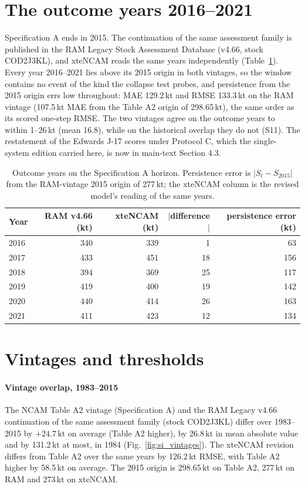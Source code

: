 \documentclass[preprint,11pt,authoryear]{elsarticle}
\theoremstyle{remark}
\newcommand{\kt}{\,\mathrm{kt}}
\begin{document}
\FloatBarrier
\section{The outcome years 2016--2021}\label{si:outcome}

Specification A ends in 2015. The continuation of the same assessment family is published in the RAM Legacy Stock Assessment Database (v4.66, stock COD2J3KL), and xteNCAM reads the same years independently (Table~\ref{tab:si_outcome}). Every year 2016--2021 lies above its 2015 origin in both vintages, so the window contains no event of the kind the collapse test probes, and persistence from the 2015 origin errs low throughout: MAE 129.2\,kt and RMSE 133.3\,kt on the RAM vintage (107.5\,kt MAE from the Table A2 origin of 298.65\,kt), the same order as its scored one-step RMSE. The two vintages agree on the outcome years to within 1--26\,kt (mean 16.8), while on the historical overlap they do not (S11). The restatement of the Edwards J-17 scores under Protocol C, which the single-system edition carried here, is now in main-text Section 4.3.

\begin{table}[!htb]
\centering\footnotesize\setlength{\tabcolsep}{3.5pt}
\caption{Outcome years on the Specification A horizon. Persistence error is $|S_t - S_{2015}|$ from the RAM-vintage 2015 origin of 277\,kt; the xteNCAM column is the revised model's reading of the same years.}
\label{tab:si_outcome}
\begin{tabular}{@{}lrrrr@{}}
\toprule
Year & RAM v4.66 (kt) & xteNCAM (kt) & $|$difference$|$ & persistence error (kt) \\
\midrule
2016 & 340 & 339 & 1 & 63 \\
2017 & 433 & 451 & 18 & 156 \\
2018 & 394 & 369 & 25 & 117 \\
2019 & 419 & 400 & 19 & 142 \\
2020 & 440 & 414 & 26 & 163 \\
2021 & 411 & 423 & 12 & 134 \\
\bottomrule
\end{tabular}
\end{table}
\FloatBarrier
\section{Vintages and thresholds}\label{si:thresholds}

\paragraph{Vintage overlap, 1983--2015} The NCAM Table A2 vintage (Specification A) and the RAM Legacy v4.66 continuation of the same assessment family (stock COD2J3KL) differ over 1983--2015 by $+24.7\kt$ on average (Table A2 higher), by 26.8\,kt in mean absolute value and by 131.2\,kt at most, in 1984 (Fig.~\ref{fig:si_vintages}). The xteNCAM revision differs from Table A2 over the same years by 126.2\,kt RMSE, with Table A2 higher by 58.5\,kt on average. The 2015 origin is 298.65\,kt on Table A2, 277\,kt on RAM and 273\,kt on xteNCAM.
\end{document}
